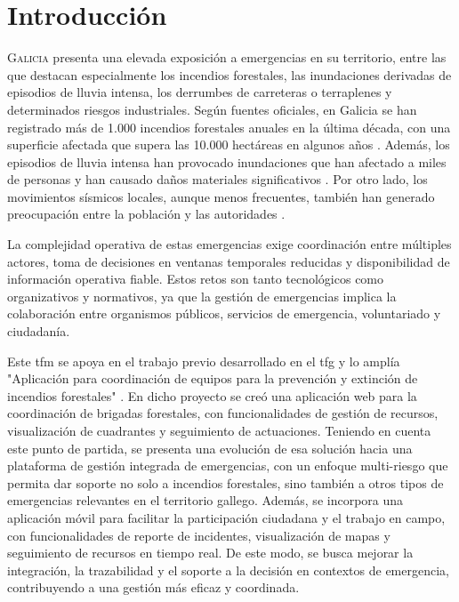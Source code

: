 \chapter{Introducción}
\label{chap:introducion}

\lettrine{G}{alicia} presenta una elevada exposición a emergencias en su territorio, entre las que destacan especialmente los incendios forestales, las inundaciones derivadas de episodios de lluvia intensa, los derrumbes de carreteras o terraplenes y determinados riesgos industriales. Según fuentes oficiales, en Galicia se han registrado más de 1.000 incendios forestales anuales en la última década, con una superficie afectada que supera las 10.000 hectáreas en algunos años \cite{EGIFMITECO}. Además, los episodios de lluvia intensa han provocado inundaciones que han afectado a miles de personas y han causado daños materiales significativos \cite{AxegaIncidenciasChuviaOurense2026}. Por otro lado, los movimientos sísmicos locales, aunque menos frecuentes, también han generado preocupación entre la población y las autoridades \cite{AxegaSismoPonteceso2026}.

La complejidad operativa de estas emergencias exige coordinación entre múltiples actores, toma de decisiones en ventanas temporales reducidas y disponibilidad de información operativa fiable. Estos retos son tanto tecnológicos como organizativos y normativos, ya que la gestión de emergencias implica la colaboración entre organismos públicos, servicios de emergencia, voluntariado y ciudadanía. 

Este \acrfull{tfm} se apoya en el trabajo previo desarrollado en el \acrfull{tfg} y lo amplía "Aplicación para coordinación de equipos para la prevención y extinción de incendios forestales" \cite{TFGAdrianGarcia2025}. En dicho proyecto se creó una aplicación web para la coordinación de brigadas forestales, con funcionalidades de gestión de recursos, visualización de cuadrantes y seguimiento de actuaciones. Teniendo en cuenta este punto de partida, se presenta una evolución de esa solución hacia una plataforma de gestión integrada de emergencias, con un enfoque multi-riesgo que permita dar soporte no solo a incendios forestales, sino también a otros tipos de emergencias relevantes en el territorio gallego. Además, se incorpora una aplicación móvil para facilitar la participación ciudadana y el trabajo en campo, con funcionalidades de reporte de incidentes, visualización de mapas y seguimiento de recursos en tiempo real. De este modo, se busca mejorar la integración, la trazabilidad y el soporte a la decisión en contextos de emergencia, contribuyendo a una gestión más eficaz y coordinada.

